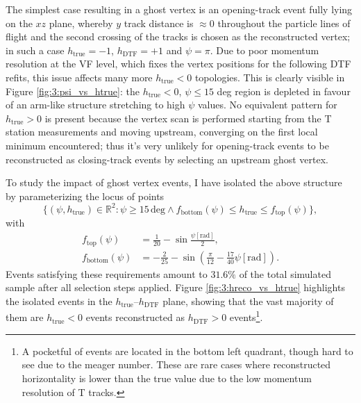 The simplest case resulting in a ghost vertex is an opening-track \lambdadecay event fully lying on the $xz$ plane, whereby $y$ track distance is $\approx 0$ throughout the particle lines of flight and the second crossing of the tracks is chosen as the reconstructed vertex;
in such a case $h_\text{true} = -1$, $h_\text{DTF}=+1$ and $\psi = \pi$.
Due to poor momentum resolution at the VF level, which fixes the vertex positions for the following DTF refits, this issue affects many more $h_\text{true} < 0$ topologies.
This is clearly visible in Figure \ref{fig:3:psi_vs_htrue}: the $h_\text{true} < 0$, $\psi \leq 15$ deg region is depleted in favour of an arm-like structure stretching to high $\psi$ values.
No equivalent pattern for $h_\text{true} > 0$ is present because the vertex scan is performed starting from the T station measurements and moving upstream, converging on the first local minimum encountered;
thus it's very unlikely for opening-track events to be reconstructed as closing-track events by selecting an upstream ghost vertex.

To study the impact of ghost vertex events, I have isolated the above structure by parameterizing the locus of points
\begin{equation}
	\big\{ \left(\psi, h_\text{true} \right) \in \mathbb{R}^2
	: 
	\psi \geq 15\,\text{deg}
	\land
	f_\text{bottom}(\psi) \leq h_\text{true} \leq f_\text{top}(\psi)
	\big\},
	\label{eq:3:psih_banana}
\end{equation}
with
\begin{subequations}
\begin{align}
	f_\text{top}(\psi) &= \frac{1}{20} - \sin\frac{\psi \left[\text{rad}\right]}{2}, \\
	f_\text{bottom}(\psi) &= - \frac{2}{25} - \sin\left(
	\frac{\pi}{12}
	-
	\frac{17}{40} \psi \left[\text{rad}\right]
	\right).
\end{align}
\end{subequations}
Events satisfying these requirements amount to $31.6\%$ of the total simulated sample after all selection steps applied.
Figure \ref{fig:3:hreco_vs_htrue} highlights the isolated events in the $h_\text{true}$--$h_\text{DTF}$ plane, showing that the vast majority of them are $h_\text{true} < 0$ events reconstructed as $h_\text{DTF} > 0$ events\footnote{A pocketful of events are located in the bottom left quadrant, though hard to see due to the meager number. These are rare cases where reconstructed horizontality is lower than the true value due to the low momentum resolution of T tracks.}.

